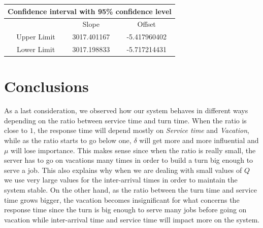 \documentclass{article}
\begin{document}
                    \begin{table}[htbp]
                        \centering 
                        \begin{tabular}{|c|c|c|}
                            
                            \hline
                            \multicolumn{3}{|c|}{\bf Confidence interval with 95\% confidence level} \\
                            
                            \hline
                            \ & Slope & Offset\\
                            \hline
                            \ Upper Limit & 3017.401167 & -5.417960402 \\ 
                            \hline
                            \ Lower Limit & 3017.198833 & -5.717214431 \\ 
                            \hline
                        \end{tabular}
                        \label{table:CI_10_fitting_lambda-mu}
                    \end{table}
   \newpage                
\section{Conclusions}
    As a last consideration, we observed how our system behaves in different ways depending on the ratio between service time and turn time. When the ratio is close to $1$, the response time will depend mostly on \textit{Service time} and \textit{Vacation}, while as the ratio starts to go below one, $\delta$ will get more and more influential and $\mu$ will lose importance. This makes sense since when the ratio is really small, the server has to go on vacations many times in order to build a turn big enough to serve a job. This also explains why when we are dealing with small values of $Q$ we use very large values for the inter-arrival times in order to maintain the system stable. On the other hand, as the ratio between the turn time and service time grows bigger, the vacation becomes insignificant for what concerns the response time since the turn is big enough to serve many jobs before going on vacation while inter-arrival time and service time will impact more on the system.
           
\end{document}

